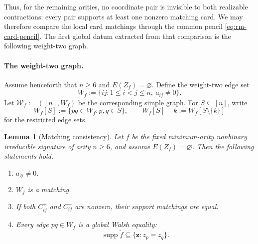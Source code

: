 \documentclass[11pt,letterpaper,onecolumn]{article}
\theoremstyle{plain}
\newtheorem{lemma}[lemma]{Lemma}
\theoremstyle{definition}
\theoremstyle{remark}
\newcommand{\supp}{\operatorname{supp}}
\begin{document}
Thus, for the remaining arities, no coordinate pair is invisible to both
realizable contractions: every pair supports at least one nonzero matching card.
We may therefore compare the local card matchings through the common pencil
\cref{eq:rm-card-pencil}.  The first global datum extracted from that
comparison is the following weight-two graph.

\paragraph{The weight-two graph.}

Assume henceforth that \(n\ge6\) and \(E(Z_f)=\varnothing\).  Define the
weight-two edge set
\begin{equation*}
  W_f:=\{ij:1\le i<j\le n,\ a_{ij}\ne0\}.
\end{equation*}
Let \(\mathcal W_f:=([n],W_f)\) be the corresponding simple graph.  For
\(S\subseteq[n]\), write
\[
 W_f[S]:=\{pq\in W_f:p,q\in S\},
 \qquad
 W_f[S]-k:=W_f[S\setminus\{k\}]
\]
for the restricted edge sets.

\begin{lemma}[Matching consistency]
\label{lem:rm-matching-consistency}
Let \(f\) be the fixed minimum-arity nonbinary irreducible signature of arity \(n\ge6\), and assume
\(E(Z_f)=\varnothing\).  Then the following statements hold.
\begin{enumerate}
\item \(a_\varnothing\ne0\).
\item \(W_f\) is a matching.
\item If both \(C_{ij}^{+}\) and \(C_{ij}^{-}\) are nonzero, their
      support matchings are equal.
\item Every edge \(pq\in W_f\) is a global Walsh equality:
\[
  \supp\widetilde f\subseteq\{{\mathbf z}:z_p=z_q\}.
\]
\end{enumerate}
\end{lemma}
\end{document}
